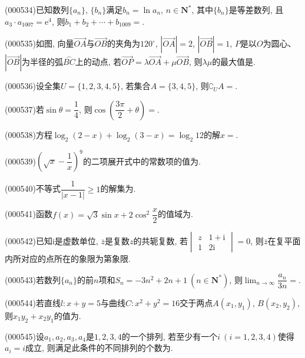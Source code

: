 \item (000534)已知数列$\{a_n\}$, $\{b_n\}$满足$b_n=\ln a_n$, $n\in \mathbf{N}^*$, 其中$\{b_n\}$是等差数列, 且$a_3\cdot a_{1007}=\mathrm{e}^4$, 则$b_1+b_2+\cdots +b_{1009}=$.
\item (000535)如图, 向量$\overrightarrow{OA}$与$\overrightarrow{OB}$的夹角为$120^\circ$, $|\overrightarrow{OA}|=2$, $|\overrightarrow{OB}|=1$, $P$是以$O$为圆心、$|\overrightarrow{OB}|$为半径的弧$\overset\frown{BC}$上的动点, 若$\overrightarrow{OP}=\lambda \overrightarrow{OA}+\mu \overrightarrow{OB}$, 则$\lambda \mu$的最大值是.
\begin{center}
\end{center}
\item (000536)设全集$U=\{ 1,2,3,4,5\}$, 若集合$A=\{3,4,5\}$, 则$\complement_U A=$.
\item (000537)若$\sin\theta=\dfrac14$, 则$\cos(\dfrac{3 \pi}2+\theta)=$.
\item (000538)方程$\log_2(2-x)+\log_2(3-x)=\log_2 12$的解$x=$.
\item (000539)$(\sqrt x-\dfrac1x)^9$的二项展开式中的常数项的值为.
\item (000540)不等式$\dfrac1{|x-1|}\ge 1 $的解集为.
\item (000541)函数$f(x)=\sqrt 3\sin x+2\cos^2\dfrac x2$的值域为.
\item (000542)已知$\mathrm{i}$是虚数单位, $\overline z$是复数$z$的共轭复数, 若$\begin{vmatrix} z & 1+\mathrm{i}  \\ 1 & 2\mathrm{i} \end{vmatrix}=0$, 则$\overline z$在复平面内所对应的点所在的象限为第象限.
\item (000543)若数列$\{a_n\}$的前$n$项和$S_n=-3n^2+2n+1 \ (n\in \mathbf{N}^*)$, 则$\displaystyle\lim_{n\to\infty}\dfrac{a_n}{3n}=$.
\item (000544)若直线$l:x+y=5$与曲线$C:x^2+y^2=16$交于两点$A(x_1,y_1)$, $B(x_2,y_2)$, 则$x_1y_2+x_2y_1$的值为.
\item (000545)设$a_1,a_2,a_3,a_4$是$1,2,3,4$的一个排列, 若至少有一个$i\ (i=1,2,3,4)$使得$a_i=i$成立, 则满足此条件的不同排列的个数为.
